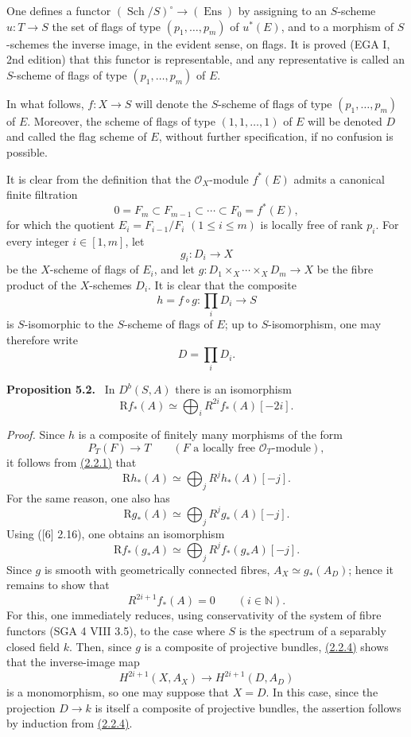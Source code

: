 \documentclass[11pt]{article}
\newenvironment{statement}[1]{\par\medskip\noindent\textbf{#1.}\ }{\par\medskip}
\begin{document}
One defines a functor $(\operatorname{Sch}/S)^\circ\to(\operatorname{Ens})$ by assigning to an $S$-scheme $u:T\to S$ the set of flags of type $(p_1,\ldots,p_m)$ of $u^*(E)$, and to a morphism of $S$-schemes the inverse image, in the evident sense, on flags. It is proved (EGA I, 2nd edition) that this functor is representable, and any representative is called an $S$-scheme of flags of type $(p_1,\ldots,p_m)$ of $E$.

In what follows, $f:X\to S$ will denote the $S$-scheme of flags of type $(p_1,\ldots,p_m)$ of $E$. Moreover, the scheme of flags of type $(1,1,\ldots,1)$ of $E$ will be denoted $D$ and called the flag scheme of $E$, without further specification, if no confusion is possible.

It is clear from the definition that the $\mathcal O_X$-module $f^*(E)$ admits a canonical finite filtration
\[
0=F_m\subset F_{m-1}\subset\cdots\subset F_0=f^*(E),
\]
for which the quotient $E_i=F_{i-1}/F_i$ $(1\le i\le m)$ is locally free of rank $p_i$. For every integer $i\in[1,m]$, let
\[
g_i:D_i\to X
\]
be the $X$-scheme of flags of $E_i$, and let $g:D_1\times_X\cdots\times_X D_m\to X$ be the fibre product of the $X$-schemes $D_i$. It is clear that the composite
\[
h=f\circ g:\prod_iD_i\to S
\tag{5.1}\label{sga5:VII:equation:5.1}
\]
is $S$-isomorphic to the $S$-scheme of flags of $E$; up to $S$-isomorphism, one may therefore write
\[
D=\prod_iD_i.
\]

\label{sga5:VII:proposition:5.2}\begin{statement}{Proposition 5.2}
In $D^b(S,A)$ there is an isomorphism
\[
\mathrm Rf_*(A)\simeq\bigoplus_i R^{2i}f_*(A)[-2i].
\]
\end{statement}

\emph{Proof.} Since $h$ is a composite of finitely many morphisms of the form
\[
P_T(F)\to T\qquad(F\text{ a locally free }\mathcal O_T\text{-module}),
\tag{Q}\label{sga5:VII:equation:q}
\]
it follows from \hyperref[sga5:VII:theorem:2.2.1]{(2.2.1)} that
\[
\mathrm Rh_*(A)\simeq\bigoplus_j R^jh_*(A)[-j].
\]
For the same reason, one also has
\[
\mathrm Rg_*(A)\simeq\bigoplus_j R^jg_*(A)[-j].
\]
Using ([6] 2.16), one obtains an isomorphism
\[
\mathrm Rf_*(g_*A)\simeq\bigoplus_j R^j f_*(g_*A)[-j].
\]
Since $g$ is smooth with geometrically connected fibres, $A_X\simeq g_*(A_D)$; hence it remains to show that
\[
R^{2i+1}f_*(A)=0\qquad (i\in\mathbb N).
\tag{5.2.1}\label{sga5:VII:equation:5.2.1}
\]
For this, one immediately reduces, using conservativity of the system of fibre functors (SGA 4 VIII 3.5), to the case where $S$ is the spectrum of a separably closed field $k$. Then, since $g$ is a composite of projective bundles, \hyperref[sga5:VII:corollary:2.2.4]{(2.2.4)} shows that the inverse-image map
\[
H^{2i+1}(X,A_X)\to H^{2i+1}(D,A_D)
\]
is a monomorphism, so one may suppose that $X=D$. In this case, since the projection $D\to k$ is itself a composite of projective bundles, the assertion follows by induction from \hyperref[sga5:VII:corollary:2.2.4]{(2.2.4)}.
\end{document}
